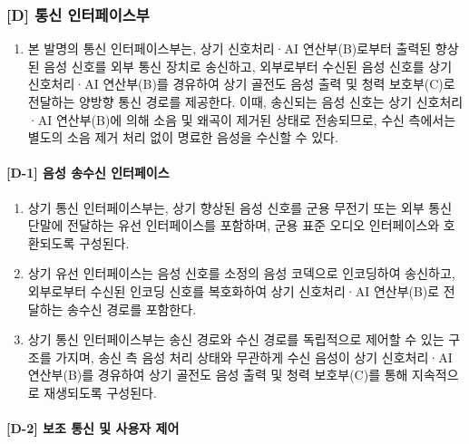 \documentclass{article}
\begin{document}
\subsubsection{[D] 통신 인터페이스부}

\begin{enumerate}[label = \textbf{(D.\arabic*)}]

    \item 본 발명의 통신 인터페이스부는, 상기 신호처리·AI 연산부(B)로부터 출력된 향상된 음성 신호를 외부 통신 장치로 송신하고, 
    외부로부터 수신된 음성 신호를 상기 신호처리·AI 연산부(B)를 경유하여 상기 골전도 음성 출력 및 청력 보호부(C)로 전달하는 양방향 통신 경로를 제공한다. 
    이때, 송신되는 음성 신호는 상기 신호처리·AI 연산부(B)에 의해 소음 및 왜곡이 제거된 상태로 전송되므로, 수신 측에서는 별도의 소음 제거 처리 없이 명료한 음성을 수신할 수 있다.

\end{enumerate}


\paragraph{[D-1] 음성 송수신 인터페이스}

\begin{enumerate}[label = \textbf{(D.1.\arabic*)}]

    \item 상기 통신 인터페이스부는, 상기 향상된 음성 신호를
    군용 무전기 또는 외부 통신 단말에 전달하는 유선
    인터페이스를 포함하며, 군용 표준 오디오 인터페이스와
    호환되도록 구성된다.

    \item 상기 유선 인터페이스는 음성 신호를 소정의 음성 코덱으로 인코딩하여 송신하고, 외부로부터 수신된 인코딩 신호를 복호화하여 상기 신호처리·AI 연산부(B)로 전달하는 송수신 경로를 포함한다.

    \item 상기 통신 인터페이스부는 송신 경로와 수신 경로를 독립적으로 제어할 수 있는 구조를 가지며, 송신 측 음성 처리 상태와 무관하게 수신 음성이 상기 신호처리·AI 연산부(B)를 경유하여 상기 골전도 음성 출력 및 청력 보호부(C)를 통해 지속적으로 재생되도록 구성된다.

\end{enumerate}


\paragraph{[D-2] 보조 통신 및 사용자 제어}
\end{document}

